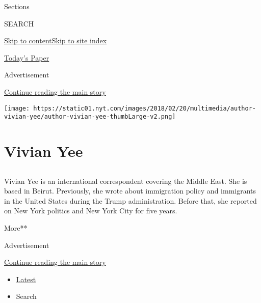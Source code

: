 Sections

SEARCH

\protect\hyperlink{site-content}{Skip to
content}\protect\hyperlink{site-index}{Skip to site index}

\href{https://myaccount.nytimes.com/auth/login?response_type=cookie\&client_id=vi}{}

\href{https://www.nytimes.com/section/todayspaper}{Today's Paper}

Advertisement

\protect\hyperlink{after-top}{Continue reading the main story}

\texttt{[image: https://static01.nyt.com/images/2018/02/20/multimedia/author-vivian-yee/author-vivian-yee-thumbLarge-v2.png]}

\hypertarget{vivian-yee}{%
\section{Vivian Yee}\label{vivian-yee}}

\subsection{}

Vivian Yee is an international correspondent covering the Middle East.
She is based in Beirut. Previously, she wrote about immigration policy
and immigrants in the United States during the Trump administration.
Before that, she reported on New York politics and New York City for
five years.

More**

Advertisement

\protect\hyperlink{after-mid1}{Continue reading the main story}

\begin{itemize}
\tightlist
\item
  \protect\hyperlink{stream-panel}{Latest}
\item
  Search
\end{itemize}


